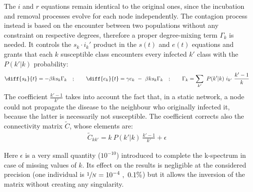 \documentclass[DIV=12, BCOR=0pt]{scrartcl}  %
\begin{document}
  The $i$ and $r$ equations remain identical to the original ones, since the incubation and removal processes evolve for each node independently. The contagion process instead is based on the encounter between two populations without any constraint on respective degrees, therefore a proper degree-mixing term $\Gamma_k$ is needed. It controls the $s_k \cdot i_k'$ product in the $s(t)$ and $e(t)$ equations and grants that each $k$ susceptible class encounters every infected $k'$ class with the $P(k'|k)$ probability:
  \begin{align}
  	\diff{s_{k}}{t} = - \beta k s_{k} \Gamma_{k} \quad;  \qquad 	\diff{e_{k}}{t} =  \gamma e_{k} \ - \ \beta k s_{k} \Gamma_{k} \quad; \qquad	\Gamma_{k} = \sum_{k'} \ P(k'|k) \ i_{k'}  \ \frac{k' - 1}{k}
  	\label{eq:seir_dbmf}
  \end{align}
%  
  The coefficient $\frac{k' - 1}{k'}$ takes into account the fact that, in a static network, a node could not propagate the disease to the neighbour who originally infected it, because the latter is necessarily not susceptible. %
  The coefficient corrects also the connectivity matrix $\tilde{C}$, whose elements are:  
  \begin{align}
		\tilde{C}_{kk'} = k \ P(k'|k) \ \frac{k' - 1}{k'} + \epsilon
  \end{align}

	Here $\epsilon$ is a very small quantity ($10^{-10}$) introduced to complete the k-spectrum in case of missing values of $k$. Its effect on the results is negligible at the considered precision (one individual is $ \sfrac{1}{N} = 10^{-4} \ , \ 0.1 \%$) but it allows the inversion of the matrix without creating any singularity.
\end{document}
